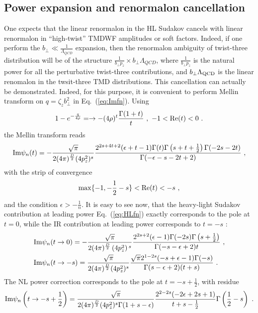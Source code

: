 \documentclass[a4paper,11pt]{article}
\begin{document}
\subsection{Power expansion and renormalon cancellation}
One expects that the linear renormalon in the HL Sudakov cancels with linear renormalon in ``high-twist'' TMDWF amplitudes or soft factors. Indeed, if one perform the $b_\perp\ll \frac{1}{\Lambda_{QCD}}$ expansion, then the renormalon ambiguity of twist-three distribution will be of the structure $\frac{1}{b_\perp p_z} \times b_\perp \Lambda_{QCD}$, where $\frac{1}{b_\perp p_z}$ is the natural power for all the perturbative twist-three contributions, and $b_\perp\Lambda_{\rm QCD}$ is the linear renomalon in the twsit-three TMD distributions. This cancellation can actually be demonstrated. Indeed, for this purpose, it is convenient to perform Mellin transform on $q=\zeta_ zb_\perp^2$ in Eq.~(\ref{eq:Imfn}).  Using
\begin{align}
1-e^{-\frac{q}{4\rho}}=\rightarrow -(4\rho)^t\frac{\Gamma(1+t)}{t} \ ,  \ -1<{\rm Re }(t)<0 \ .
\end{align}
the Mellin transform reads
\begin{align}
 {\rm Im} \psi_n(t)=-\frac{\sqrt{\pi}}{2(4\pi)^{\frac{D}{2}}(4p_z^2)^{s}}
 \frac{2^{2 s+4 t+2}(\epsilon+t-1)  \Gamma (t) \Gamma \left(s+t+\frac{1}{2}\right) \Gamma (-2s -2t)}{\Gamma (-\epsilon-s-2 t+2)} \ ,
\end{align}
with the strip of convergence
\begin{align}
{\rm max}\{-1,-\frac{1}{2}-s \}<{\rm Re}(t)<-s \ ,
\end{align}
and the condition $\epsilon>-\frac{1}{n}$. It is easy to see now, that the heavy-light Sudakov contribution at leading power Eq.~(\ref{eq:HLfn}) exactly corresponds to the pole at $t=0$, while the IR contribution at leading power corresponds to $t=-s$ :
\begin{align}
 &{\rm Im} \psi_n(t \rightarrow 0)=-\frac{\sqrt{\pi}}{2(4\pi)^{\frac{D}{2}}\left(4 p_z^2\right){}^{s}}\frac{ 2^{2s+2}(\epsilon -1) \Gamma (-2 s) \Gamma \left(s+\frac{1}{2}\right)}{\Gamma (-s-\epsilon +2)t}  \ , \\
 &{\rm Im} \psi_n(t \rightarrow -s)=\frac{\sqrt{\pi}}{2(4\pi)^{\frac{D}{2}}(4p_z^2)^{s}} \frac{\sqrt{\pi } 2^{1-2 s} (-s+\epsilon -1) \Gamma (-s)}{\Gamma (s-\epsilon +2)(t+s)} \ .
\end{align}
The NL power correction corresponds to the pole at $t=-s+\frac{1}{2}$, with residue
\begin{align}
 {\rm Im} \psi_n\left(t\rightarrow -s+\frac{1}{2}\right)=\frac{\sqrt{\pi}}{2(4\pi)^{\frac{D}{2}}(4p_z^2)^{s}\Gamma (1+s-\epsilon)}\frac{2^{2-2 s} (-2\epsilon+2 s+1)}{t+s-\frac{1}{2}}\Gamma \left(\frac{1}{2}-s\right) \ .
\end{align}
\end{document}
